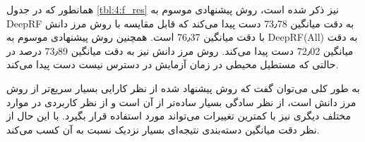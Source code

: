 همانطور که در جدول
\ref{tbl:4:f_res}
نیز ذکر شده است، روش پیشنهادی موسوم به DeepRF به دقت میانگین 73٫78 دست پیدا می‌کند که قابل مقایسه با روش مرز دانش با دقت میانگین 76٫37 است. همچنین روش پیشنهادی موسوم به DeepRF(All) به دقت میانگین 72٫02 دست پیدا می‌کند. روش مرز دانش نیز به دقت میانگین 73٫89 درصد در حالتی که مستطیل محیطی در زمان آزمایش در دسترس نیست دست پیدا می‌کند.

به طور کلی می‌توان گفت که روش پیشنهاد شده از نظر کارایی بسیار سریع‌تر از روش مرز دانش است، از نظر سادگی بسیار ساده‌تر از آن است و از نظر کاربردی در موارد مختلف دیگری نیز با کمترین تغییرات می‌تواند مورد استفاده قرار بگیرد. با این حال از نظر دقت میانگین دسته‌بندی نتیجه‌ای بسیار نزدیک نسبت به آن کسب می‌کند.
